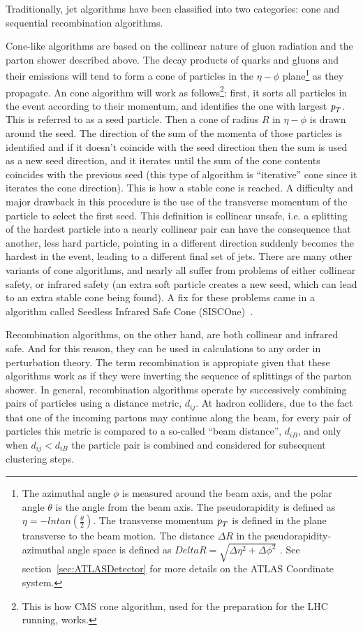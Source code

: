 Traditionally, jet algorithms have been classified into two categories: cone and sequential recombination algorithms. 

Cone-like algorithms are based on the collinear nature of gluon radiation and the parton shower described above. The decay products of quarks and gluons and their emissions will tend to form a cone of particles in the $\eta - \phi$ plane\footnote{The azimuthal angle $\phi$ is measured around the beam axis, and the polar angle $\theta$ is the angle from the beam axis. The pseudorapidity is defined as $\eta = − ln tan(\frac{\theta}{2})$. The transverse momentum ${\emph{p}_{T}}$ is defined in the plane transverse to the beam motion. The distance $\Delta R$ in the pseudorapidity-azimuthal angle space is defined as $Delta R = \sqrt{ \Delta \eta^2  + \Delta \phi^2}$ . See section~\ref{sec:ATLASDetector} for more details on the ATLAS Coordinate system.} 
as they propagate.
An cone algorithm will work as follows\footnote{This is how CMS cone algorithm, used for the preparation for the LHC running, works.}: first, it sorts all particles in the event according to their momentum, and identifies the one with largest ${\emph{p}_{T}}$. This is referred to as a seed particle. Then a cone of radius $R$ in  $\eta - \phi$ is drawn around the seed. The direction of the sum of the momenta of those particles is identified and if it doesn't coincide with the seed direction then the sum is used as a new seed direction, and it iterates until the sum of the cone contents coincides with the previous seed (this type of algorithm is  ``iterative'' cone since it iterates the cone direction). This is how a stable cone is reached. A difficulty and major drawback in this procedure is the use of the transverse momentum of the particle to select the first seed. This definition is collinear unsafe, i.e. a splitting of the hardest particle into a nearly collinear pair can have the consequence that another, less hard particle, pointing in a different direction suddenly becomes the hardest in the event, leading to a different final set of jets. There are many other variants of cone algorithms, and nearly all suffer from problems of either collinear safety, or infrared safety (an extra soft particle creates a new seed, which can lead to an extra stable cone being found). A fix for these problems came in a algorithm called Seedless Infrared Safe Cone (SISCOne)~\cite{SISCone}.


Recombination algorithms, on the other hand, are both collinear and infrared safe. And for this reason, they can be used in calculations to any order in perturbation theory. The term recombination is appropiate given that these algorithms work as if they were inverting the sequence of splittings of the parton shower. In general, recombination algorithms operate by successively combining pairs of particles using a distance metric, $d_{ij}$.  At hadron colliders, due to the fact that one of the incoming partons may continue along the beam, for every pair of particles this metric is compared to a so-called ``beam distance'', $d_{iB}$, and only when  $d_{ij}<d_{iB}$ the particle pair is combined and considered for subsequent clustering steps. 

